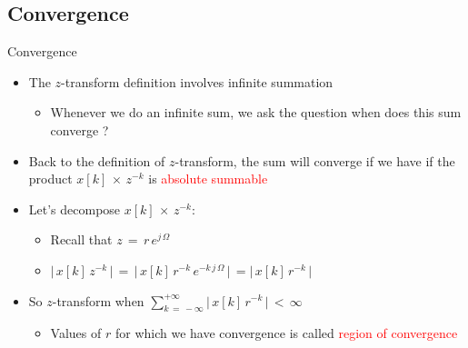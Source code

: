 \subsection{Convergence}
\begin{frame}[t,allowframebreaks]{Convergence}

\begin{itemize}

\item The $z$-transform definition involves infinite summation

	\begin{itemize}
	\item Whenever we do an infinite sum, we ask the question  when does this sum converge ?
	\end{itemize}

\item Back to the definition of $z$-transform, the sum will converge if we have if the product $x[k] \, \times \, z^{-k}$ is \textcolor{red}{absolute summable}

\item Let's decompose $x[k] \, \times \, z^{-k}$:

	\begin{itemize}
	\item Recall that $z \, = \, r \, e^{j \, \Omega}$
	
	\item $\lvert \,x[k] \,z^{-k}  \,\rvert \, = \, \lvert \,x[k] \,r^{-k} \, e^{-k \, j \, \Omega}  \,\rvert \, = \lvert \,x[k] \,r^{-k} \,\rvert$
	\end{itemize}

\item So $z$-transform when $\displaystyle\sum_{k \, = \, - \infty}^{+ \infty} \lvert \,x[k] \,r^{-k} \,\rvert \, < \, \infty$

	\begin{itemize}
	\item Values of $r$ for which we have convergence is called \textcolor{red}{region of convergence}
	\end{itemize}

\end{itemize}


\end{frame}

